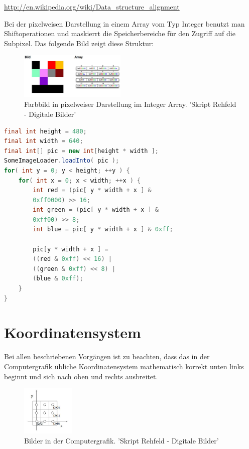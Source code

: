 \documentclass[tog]{acmsiggraph}
\begin{document}
{\small\url{http://en.wikipedia.org/wiki/Data_structure_alignment}}


Bei der pixelweisen Darstellung in einem Array vom Typ Integer benutzt man Shiftoperationen und maskierrt die Speicherbereiche für den Zugriff auf die Subpixel. Das folgende Bild zeigt diese Struktur:

\begin{figure}[ht]
  \centering
  \includegraphics[width=2.0in]{images/BildPixelweiseInteger}
  \caption{Farbbild in pixelweiser Darstellung im Integer Array. 'Skript Rehfeld - Digitale Bilder'}
  \label{fig:Pixelweise Darstellung im Array.}
\end{figure}

\begin{lstlisting}[language=Java]
final int height = 480;
final int width = 640;
final int[] pic = new int[height * width ];
SomeImageLoader.loadInto( pic );
for( int y = 0; y < height; ++y ) {
	for( int x = 0; x < width; ++x ) {
	    int red = (pic[ y * width + x ] &
 	    0xff0000) >> 16;
	    int green = (pic[ y * width + x ] &
 	    0xff00) >> 8;
	    int blue = pic[ y * width + x ] & 0xff;

	    pic[y * width + x ] = 
	    ((red & 0xff) << 16) | 
	    ((green & 0xff) << 8) | 
	    (blue & 0xff);
	}
}
\end{lstlisting}



\section{Koordinatensystem}
Bei allen beschriebenen Vorgängen ist zu beachten, dass das in der Computergrafik übliche Koordinatensystem mathematisch korrekt unten links beginnt und sich nach oben und rechts ausbreitet.

\begin{figure}[ht]
  \centering
  \includegraphics[width=1.0in]{images/koordinatenSystemComputergrafik}
  \caption{Bilder in der Computergrafik. 'Skript Rehfeld - Digitale Bilder'}
  \label{fig:Koordinatenursprung unten links}
\end{figure}
\end{document}

